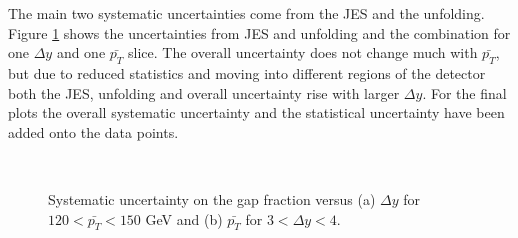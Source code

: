 The main two systematic uncertainties come from the JES and the unfolding. Figure \ref{GBJ1:SystUncert} shows the uncertainties from JES and unfolding and the combination for one $\Delta y$ and one $\bar{p_T}$ slice. The overall uncertainty does not change much with $\bar{p_T}$, but due to reduced statistics and moving into different regions of the detector both the JES, unfolding and overall uncertainty rise with larger $\Delta y$. For the final plots the overall systematic uncertainty and the statistical uncertainty have been added onto the data points.

\begin{figure}
\centering
\mbox{
              \quad
              \quad
                              }
\caption[Systematic uncertainty for the gap fraction for a slice in $\bar{p_T}$ and $\Delta y$]{Systematic uncertainty on the gap fraction versus (a) $\Delta y$ for $120<\bar{p_T}<150$ GeV and (b) $\bar{p_T}$ for $3<\Delta y<4$. 
\label{GBJ1:SystUncert}}
\end{figure}

